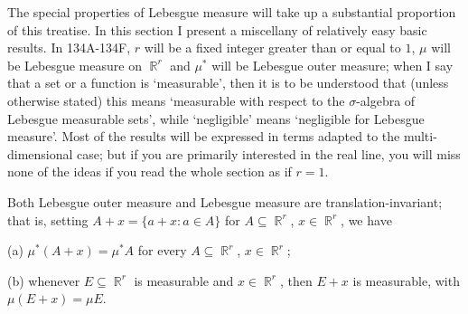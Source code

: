      
\def\chaptername{Complements}
\def\sectionname{More on Lebesgue measure}
     
     
The special properties of Lebesgue measure will take up a substantial
proportion of this treatise.   In this section I present a miscellany of
relatively easy basic results.    In
134A-134F, %
$r$ will be a fixed
integer greater than or equal to $1$, $\mu$ will be Lebesgue measure on
$\BbbR^r$ and $\mu^*$ will be Lebesgue outer measure;  when I say that a set or a function is `measurable', then it is
to be understood that (unless otherwise stated) this means `measurable
with respect to the $\sigma$-algebra of Lebesgue measurable sets', while
`negligible' means `negligible for Lebesgue measure'.   Most of the
results will be expressed in terms adapted to the
multi-dimensional case;  but if you are primarily interested in the
real line, you will miss none of the ideas if you read the
whole section as if $r=1$.
     
 Both Lebesgue outer measure and Lebesgue
measure are translation-invariant;  that is, setting
$A+x=\{a+x:a\in A\}$ for $A\subseteq\BbbR^r$, $x\in\BbbR^r$, we have
     
(a) $\mu^*(A+x)=\mu^* A$ for every $A\subseteq\BbbR^r$, $x\in\BbbR^r$;
     
(b) whenever $E\subseteq\BbbR^r$ is measurable and $x\in\BbbR^r$, then
$E+x$ is measurable, with $\mu(E+x)=\mu E$.
     
